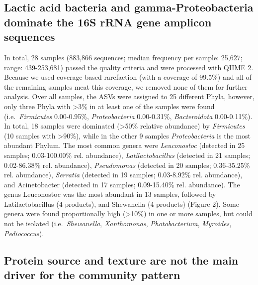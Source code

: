 \documentclass[preprint, 3p,
authoryear]{elsarticle} %
\begin{document}
\hypertarget{lactic-acid-bacteria-and-gamma-proteobacteria-dominate-the-16s-rrna-gene-amplicon-sequences}{%
\subsection{Lactic acid bacteria and gamma-Proteobacteria dominate the
16S rRNA gene amplicon
sequences}\label{lactic-acid-bacteria-and-gamma-proteobacteria-dominate-the-16s-rrna-gene-amplicon-sequences}}

In total, 28 samples (883,866 sequences; median frequency per sample:
25,627; range: 439-253,681) passed the quality criteria and were
processed with QIIME 2. Because we used coverage based rarefaction (with
a coverage of 99.5\%) and all of the remaining samples meat this
coverage, we removed none of them for further analysis. Over all
samples, the ASVs were assigned to 25 different Phyla, however, only
three Phyla with \textgreater3\% in at least one of the samples were
found (i.e.~\emph{Firmicutes} 0.00-0.95\%, \emph{Proteobacteria}
0.00-0.31\%, \emph{Bacteroidota} 0.00-0.11\%). In total, 18 samples were
dominated (\textgreater50\% relative abundance) by \emph{Firmicutes} (10
samples with \textgreater90\%), while in the other 9 samples
\emph{Proteobacteria} is the most abundant Phylum. The most common
genera were \emph{Leuconostoc} (detected in 25 samples; 0.03-100.00\%
rel. abundance), \emph{Latilactobacillus} (detected in 21 samples;
0.02-86.38\% rel. abundance), \emph{Pseudomonas} (detected in 20
samples; 0.36-35.25\% rel. abundance), \emph{Serratia} (detected in 19
samples; 0.03-8.92\% rel. abundance), and Acinetobacter (detected in 17
samples; 0.09-15.40\% rel. abundance). The genus Leuconostoc was the
most abundant in 13 samples, followed by Latilactobacillus (4 products),
and Shewanella (4 products) (Figure 2). Some genera were found
proportionally high (\textgreater10\%) in one or more samples, but could
not be isolated (i.e.~\emph{Shewanella}, \emph{Xanthomonas},
\emph{Photobacterium}, \emph{Myroides}, \emph{Pediococcus}).

\hypertarget{protein-source-and-texture-are-not-the-main-driver-for-the-community-pattern}{%
\subsection{Protein source and texture are not the main driver for the
community
pattern}\label{protein-source-and-texture-are-not-the-main-driver-for-the-community-pattern}}
\end{document}
